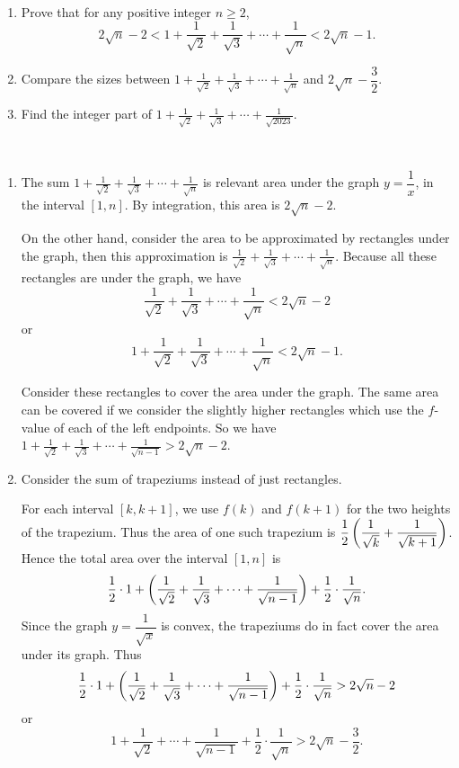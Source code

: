 \begin{exercise} \
\begin{enumerate}[label=(\alph*)]
\item Prove that for any positive integer $n\ge2$,
\[ 2\sqrt{n}-2<1+\frac{1}{\sqrt{2}}+\frac{1}{\sqrt{3}}+\cdots+\frac{1}{\sqrt{n}}<2\sqrt{n}-1. \]
\item Compare the sizes between $\displaystyle1+\frac{1}{\sqrt{2}}+\frac{1}{\sqrt{3}}+\cdots+\frac{1}{\sqrt{n}}$ and $2\sqrt{n}-\dfrac{3}{2}$.
\item Find the integer part of $\displaystyle1+\frac{1}{\sqrt{2}}+\frac{1}{\sqrt{3}}+\cdots+\frac{1}{\sqrt{2023}}$.
\end{enumerate}
\end{exercise}

\begin{solution} \
\begin{enumerate}[label=(\alph*)]
\item The sum $\displaystyle1+\frac{1}{\sqrt{2}}+\frac{1}{\sqrt{3}}+\cdots+\frac{1}{\sqrt{n}}$ is relevant area under the graph $y=\dfrac{1}{x}$, in the interval $[1,n]$. By integration, this area is $2\sqrt{n}-2$.

On the other hand, consider the area to be approximated by rectangles under the graph, then this approximation is $\displaystyle\frac{1}{\sqrt{2}}+\frac{1}{\sqrt{3}}+\cdots+\frac{1}{\sqrt{n}}$. Because all these rectangles are under the graph, we have
\[ \frac{1}{\sqrt{2}}+\frac{1}{\sqrt{3}}+\cdots+\frac{1}{\sqrt{n}}<2\sqrt{n}-2 \]
or
\[ 1+\frac{1}{\sqrt{2}}+\frac{1}{\sqrt{3}}+\cdots+\frac{1}{\sqrt{n}}<2\sqrt{n}-1. \]

Consider these rectangles to cover the area under the graph. The same area can be covered if we consider the slightly higher rectangles which use the $f$-value of each of the left endpoints. So we have $\displaystyle1+\frac{1}{\sqrt{2}}+\frac{1}{\sqrt{3}}+\cdots+\frac{1}{\sqrt{n-1}}>2\sqrt{n}-2$.

\item Consider the sum of trapeziums instead of just rectangles.

For each interval $[k,k+1]$, we use $f(k)$ and $f(k+1)$ for the two heights of the trapezium. Thus the area of one such trapezium is $\displaystyle\frac{1}{2}\left(\frac{1}{\sqrt{k}}+\frac{1}{\sqrt{k+1}}\right)$. Hence the total area over the interval $[1,n]$ is
\[ \frac{1}{2}\cdot1+\left(\frac{1}{\sqrt{2}}+\frac{1}{\sqrt{3}}+\cdots+\frac{1}{\sqrt{n-1}}\right)+\frac{1}{2}\cdot\frac{1}{\sqrt{n}}. \]
Since the graph $y=\dfrac{1}{\sqrt{x}}$ is convex, the trapeziums do in fact cover the area under its graph. Thus
\[ \frac{1}{2}\cdot1+\left(\frac{1}{\sqrt{2}}+\frac{1}{\sqrt{3}}+\cdots+\frac{1}{\sqrt{n-1}}\right)+\frac{1}{2}\cdot\frac{1}{\sqrt{n}}>2\sqrt{n}-2 \]
or
\[ 1+\frac{1}{\sqrt{2}}+\cdots+\frac{1}{\sqrt{n-1}}+\frac{1}{2}\cdot\frac{1}{\sqrt{n}}>2\sqrt{n}-\frac{3}{2}. \]


\end{enumerate}
\end{solution}
